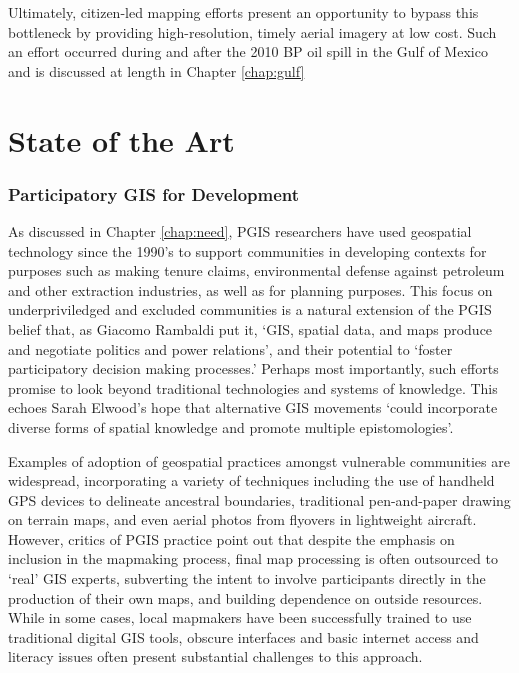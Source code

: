 \documentclass[11pt,oneside,notitlepage]{report}
\begin{document}
Ultimately, citizen-led mapping efforts present an opportunity to bypass this bottleneck by providing high-resolution, timely aerial imagery at low cost. Such an effort occurred during and after the 2010 BP oil spill in the Gulf of Mexico and is discussed at length in Chapter \ref{chap:gulf} 

\chapter{State of the Art}

\subsection{Participatory GIS for Development}
\label{subsec:pgis}

As discussed in Chapter \ref{chap:need}, \ac{PGIS} researchers have used geospatial technology since the 1990's to support communities in developing contexts for purposes such as making tenure claims, environmental defense against petroleum and other extraction industries, as well as for planning purposes. This focus on underpriviledged and excluded communities is a natural extension of the \ac{PGIS} belief that, as Giacomo Rambaldi put it, `GIS, spatial data, and maps produce and negotiate politics and power relations', and their potential to `foster participatory decision making processes.' \cite{rambaldi2006participatory}\cite{osha2006participatory} Perhaps most importantly, such efforts promise to look beyond traditional technologies and systems of knowledge. This echoes Sarah Elwood's hope that alternative GIS movements `could incorporate diverse forms of spatial knowledge and promote multiple epistomologies'. \cite{elwood2009representations} 

\label{subsec:pgisshortcomings}

Examples of adoption of geospatial practices amongst vulnerable communities are widespread, incorporating a variety of techniques including the use of handheld GPS devices to delineate ancestral boundaries, traditional pen-and-paper drawing on terrain maps, and even aerial photos from flyovers in lightweight aircraft. However, critics of \ac{PGIS} practice point out that despite the emphasis on inclusion in the mapmaking process, final map processing is often outsourced to `real' GIS experts, subverting the intent to involve participants directly in the production of their own maps, and building dependence on outside resources. While in some cases, local mapmakers have been successfully trained to use traditional digital GIS tools, obscure interfaces and basic internet access and literacy issues often present substantial challenges to this approach. \cite{poole2006there} 
\end{document}
